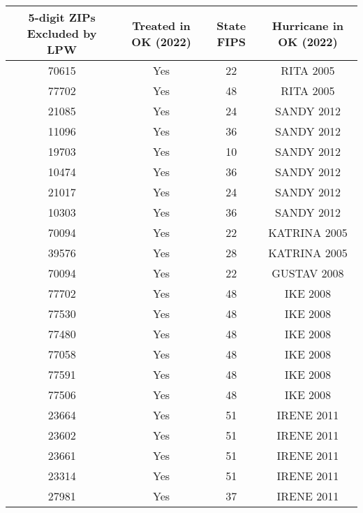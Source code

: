 \begin{tabular}{cccc}
  \hline
5-digit ZIPs Excluded by LPW & Treated in OK (2022) & State FIPS & Hurricane in OK (2022) \\ 
  \hline
70615 & Yes & 22 & RITA 2005 \\ 
  77702 & Yes & 48 & RITA 2005 \\ 
  21085 & Yes & 24 & SANDY 2012 \\ 
  11096 & Yes & 36 & SANDY 2012 \\ 
  19703 & Yes & 10 & SANDY 2012 \\ 
  10474 & Yes & 36 & SANDY 2012 \\ 
  21017 & Yes & 24 & SANDY 2012 \\ 
  10303 & Yes & 36 & SANDY 2012 \\ 
  70094 & Yes & 22 & KATRINA 2005 \\ 
  39576 & Yes & 28 & KATRINA 2005 \\ 
  70094 & Yes & 22 & GUSTAV 2008 \\ 
  77702 & Yes & 48 & IKE 2008 \\ 
  77530 & Yes & 48 & IKE 2008 \\ 
  77480 & Yes & 48 & IKE 2008 \\ 
  77058 & Yes & 48 & IKE 2008 \\ 
  77591 & Yes & 48 & IKE 2008 \\ 
  77506 & Yes & 48 & IKE 2008 \\ 
  23664 & Yes & 51 & IRENE 2011 \\ 
  23602 & Yes & 51 & IRENE 2011 \\ 
  23661 & Yes & 51 & IRENE 2011 \\ 
  23314 & Yes & 51 & IRENE 2011 \\ 
  27981 & Yes & 37 & IRENE 2011 \\ 
   \hline
\end{tabular}

